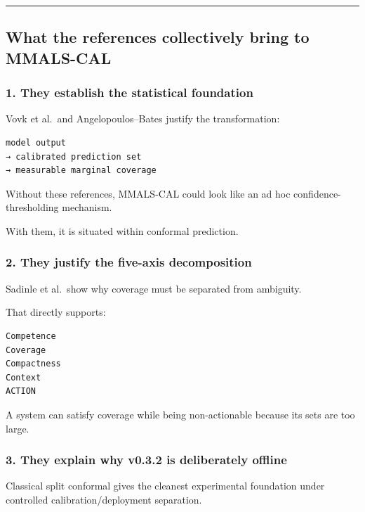 \begin{center}\rule{0.5\linewidth}{0.5pt}\end{center}

\subsection{What the references collectively bring to MMALS-CAL}\label{what-the-references-collectively-bring-to-mmals-cal}

\subsubsection{1. They establish the statistical foundation}\label{they-establish-the-statistical-foundation}

Vovk et al.~and Angelopoulos--Bates justify the transformation:

\begin{lstlisting}
model output
→ calibrated prediction set
→ measurable marginal coverage
\end{lstlisting}

Without these references, MMALS-CAL could look like an ad hoc confidence-thresholding mechanism.

With them, it is situated within conformal prediction.

\subsubsection{2. They justify the five-axis decomposition}\label{they-justify-the-five-axis-decomposition}

Sadinle et al.~show why coverage must be separated from ambiguity.

That directly supports:

\begin{lstlisting}
Competence
Coverage
Compactness
Context
ACTION
\end{lstlisting}

A system can satisfy coverage while being non-actionable because its sets are too large.

\subsubsection{3. They explain why v0.3.2 is deliberately offline}\label{they-explain-why-v0.3.2-is-deliberately-offline}

Classical split conformal gives the cleanest experimental foundation under controlled calibration/deployment separation.

